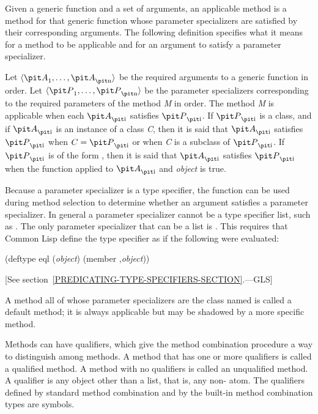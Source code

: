 Given a generic function and a set of arguments, an {\bit applicable
method\/} is a method for that generic function whose parameter
specializers are satisfied by their corresponding arguments.  The
following definition specifies what it means for a method to be
applicable and for an argument to satisfy a parameter specializer.

Let $\langle {\it A}\sub 1, \ldots, {\it A}\sub {\hbox{\scriptsize\it n}}\rangle$ be the required
arguments to a generic function in order. Let $\langle {\it P}\sub 1,
\ldots, {\it P}\sub {\hbox{\scriptsize\it n}}\rangle$ be the parameter specializers corresponding to
the required parameters of the method {\it M} in order.  The method {\it M} is
{\bit applicable\/} when each ${\it A}\sub {\hbox{\scriptsize\it i}}$
{\bit satisfies\/} ${\it P}\sub {\hbox{\scriptsize\it i}}$.
If ${\it P}\sub {\hbox{\scriptsize\it i}}$ is a class,
and if ${\it A}\sub {\hbox{\scriptsize\it i}}$ is an instance of a class
{\it C}, then it is said that ${\it A}\sub {\hbox{\scriptsize\it i}}$ {\bit satisfies\/}
${\it P}\sub {\hbox{\scriptsize\it i}}$ when $C={\it P}\sub {\hbox{\scriptsize\it i}}$ or when {\it C} is a subclass of ${\it P}\sub {\hbox{\scriptsize\it i}}$.  If
${\it P}\sub {\hbox{\scriptsize\it i}}$ is of the form
, then it is said that
${\it A}\sub {\hbox{\scriptsize\it i}}$ satisfies ${\it P}\sub {\hbox{\scriptsize\it i}}$
when the function  applied to
${\it A}\sub {\hbox{\scriptsize\it i}}$ and {\it object} is true.

Because a parameter specializer is a type specifier, the function 
 can be used during method selection to determine whether an
argument satisfies a parameter specializer.  In general a
parameter specializer cannot be a type specifier list, such as 
.  The only parameter specializer that can
be a list is .  This requires that
Common Lisp define the type specifier 
as if the following were evaluated:

\begin{lisp}
(deftype eql ({\it object\/}) {\Xbq}(member ,{\it object\/}))
\end{lisp}
[See section~\ref{PREDICATING-TYPE-SPECIFIERS-SECTION}.---GLS]

A method all of whose parameter specializers are the class named 
 is called a {\bit default method}; it is always applicable but
may be shadowed by a more specific method.

Methods can have {\bit qualifiers}, which give the method combination
procedure a way to distinguish among methods.  A method that has one
or more qualifiers is called a {\bit qualified\/} method.
A method with no qualifiers is called an {\bit unqualified method}. 
A qualifier is any object other than a list, that is,
any non- atom.  The qualifiers defined by standard method combination
and by the built-in method combination types are symbols.

